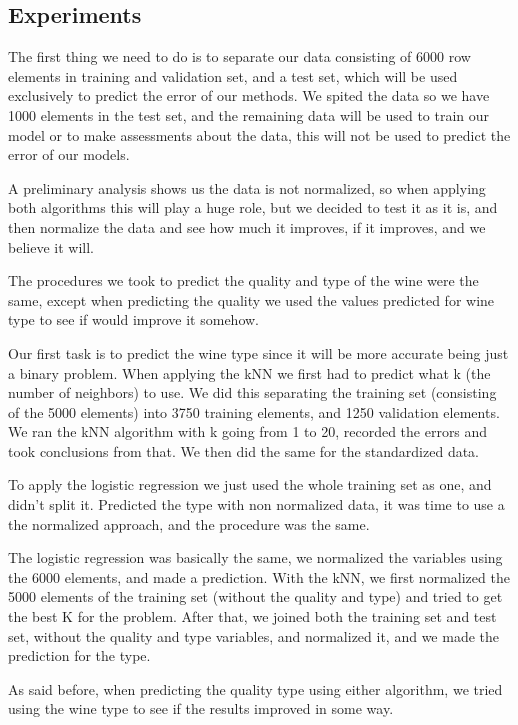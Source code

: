 \documentclass[twoside]{article}
\begin{document}
\begin{multicols}{2}


\section{Experiments}
The first thing we need to do is to separate our data consisting of 6000 row elements in training and validation set, and a test set, which will be used exclusively to predict the error of our methods. We spited the data so we have 1000 elements in the test set, and the remaining data will be used to train our model or to make assessments about the data, this will not be used to predict the error of our models.\par
	A preliminary analysis shows us the data is not normalized, so when applying both algorithms this will play a huge role, but we decided to test it as it is, and then normalize the data and see how much it improves, if it improves, and we believe it will.\par
	The procedures we took to predict the quality and type of the wine were the same, except when predicting the quality we used the values predicted for wine type to see if would improve it somehow.\par
	Our first task is to predict the wine type since it will be more accurate being just a binary problem. When applying the kNN we first had to predict what k (the number of neighbors) to use. We did this separating the training set (consisting of the 5000 elements) into 3750 training elements, and 1250 validation elements. We ran the kNN algorithm with k going from 1 to 20, recorded the errors and took conclusions from that. We then did the same for the standardized data.\par
	 To apply the logistic regression we just used the whole training set as one, and didn't split it. Predicted the type with non normalized data, it was time to use a the normalized approach, and the procedure was the same.\par
	The logistic regression was basically the same, we normalized the variables using the 6000 elements, and made a prediction. With the kNN, we first normalized the 5000 elements of the training set (without the quality and type) and tried to get the best K for the problem. After that, we joined both the training set and test set, without the quality and type variables, and normalized it, and we made the prediction for the type.\par
As said before, when predicting the quality type using either algorithm, we tried using the wine type to see if the results improved in some way.


\end{multicols}
\end{document}
